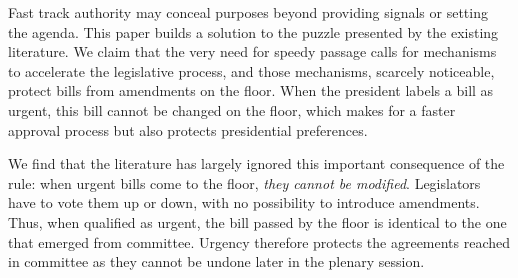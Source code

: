 \documentclass[letter,12pt]{article}
\begin{document}

Fast track authority may conceal purposes beyond providing signals or setting the agenda. This paper builds a solution to the puzzle presented by the existing literature. We claim that the very need for speedy passage calls for mechanisms to accelerate the legislative process, and those mechanisms, scarcely noticeable, protect bills from amendments on the floor. When the president labels a bill as urgent, this bill cannot be changed on the floor, which makes for a faster approval process but also protects presidential preferences.

We find that the literature has largely ignored this important consequence of the rule: when urgent bills come to the floor, \emph{they cannot be modified}. Legislators have to vote them up or down, with no possibility to introduce amendments. Thus, when qualified as urgent, the bill passed by the floor is identical to the one that emerged from committee. Urgency therefore protects the agreements reached in committee as they cannot be undone later in the plenary session.


\end{document}
